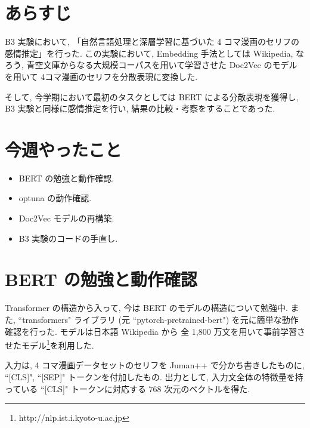 \documentclass[twocolumn]{jarticle}     %
\begin{document}

\section{あらすじ}
B3 実験において, 「自然言語処理と深層学習に基づいた 4 コマ漫画のセリフの感情推定」を行った. この実験において, Embedding 手法としては Wikipedia, なろう, 青空文庫からなる大規模コーパスを用いて学習させた Doc2Vec のモデルを用いて 4コマ漫画のセリフを分散表現に変換した.

そして, 今学期において最初のタスクとしては BERT\cite{BERT} による分散表現を獲得し, B3 実験と同様に感情推定を行い, 結果の比較・考察をすることであった.

\section{今週やったこと}

\begin{itemize}
  \item BERT の勉強と動作確認.
  \item optuna の動作確認.
  \item Doc2Vec モデルの再構築.
  \item B3 実験のコードの手直し.
\end{itemize}

\section{BERT の勉強と動作確認}
Transformer の構造から入って, 今は BERT のモデルの構造について勉強中.
また, ``transformers" ライブラリ (元 ``pytorch-pretrained-bert") を元に簡単な動作確認を行った.
モデルは日本語 Wikipedia から 全 1,800 万文を用いて事前学習させたモデル\footnote{http://nlp.ist.i.kyoto-u.ac.jp}を利用した.

入力は, 4 コマ漫画データセットのセリフを Juman++ で分かち書きしたものに, ``[CLS]", ``[SEP]" トークンを付加したもの. 出力として, 入力文全体の特徴量を持っている ``[CLS]" トークンに対応する $768$ 次元のベクトルを得た.
\end{document}
